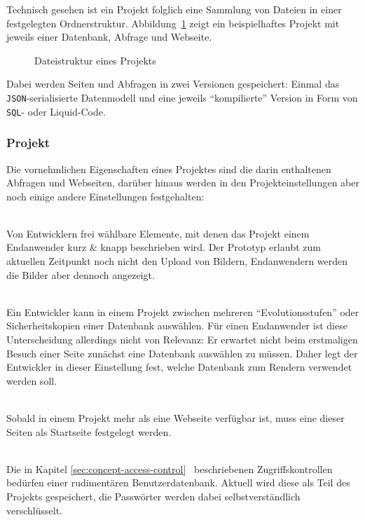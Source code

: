 Technisch gesehen ist ein Projekt folglich eine Sammlung von Dateien in einer festgelegten Ordnerstruktur. Abbildung~\ref{fig:project-disk-structure} zeigt ein beispielhaftes Projekt mit jeweils einer Datenbank, Abfrage und Webseite.

\begin{figure}[h!]
  \caption{Dateistruktur eines Projekts}
  \label{fig:project-disk-structure}
\end{figure}

Dabei werden Seiten und Abfragen in zwei Versionen gespeichert: Einmal das \texttt{JSON}-serialisierte Datenmodell und eine jeweils "`kompilierte"' Version in Form von \texttt{SQL}- oder Liquid-Code.

\subsubsection{Projekt}
\label{sec:data-model-project}

Die vornehmlichen Eigenschaften eines Projektes sind die darin enthaltenen Abfragen und Webseiten, darüber hinaus werden in den Projekteinstellungen aber noch einige andere Einstellungen festgehalten:

\begin{description}[noitemsep]
\item[Name, Beschreibung \& Bild] \hfill \\
  Von Entwicklern frei wählbare Elemente, mit denen das Projekt einem Endanwender kurz \& knapp beschrieben wird. Der Prototyp erlaubt zum aktuellen Zeitpunkt noch nicht den Upload von Bildern, Endanwendern werden die Bilder aber dennoch angezeigt.
\item[Aktivierte Datenbank] \hfill \\
  Ein Entwickler kann in einem Projekt zwischen mehreren "`Evolutionsstufen"' oder Sicherheitskopien einer Datenbank auswählen. Für einen Endanwender ist diese Unterscheidung allerdings nicht von Relevanz: Er erwartet nicht beim erstmaligen Besuch einer Seite zunächst eine Datenbank auswählen zu müssen. Daher legt der Entwickler in dieser Einstellung fest, welche Datenbank zum Rendern verwendet werden soll.
\item[Startseite] \hfill \\
  Sobald in einem Projekt mehr als eine Webseite verfügbar ist, muss eine dieser Seiten als Startseite festgelegt werden.
\item[Benutzerdatenbank] \hfill \\
  Die in Kapitel \ref{sec:concept-access-control}~ beschriebenen Zugriffskontrollen bedürfen einer rudimentären Benutzerdatenbank. Aktuell wird diese als Teil des Projekts gespeichert, die Passwörter werden dabei selbstverständlich verschlüsselt.
\end{description}

